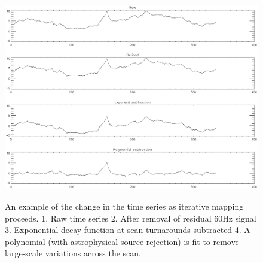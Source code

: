 \documentclass[12pt,preprint]{aastex}
\begin{document}
\begin{figure}
  \begin{minipage}{6.5in}
    \begin{center}
      \includegraphics[scale=0.9]{iterative_mapping1}
      \caption{An example of the change in the time series as
      iterative mapping proceeds.  1. Raw time series 2. After removal
      of residual 60Hz signal 3. Exponential decay function at scan
      turnarounds subtracted 4. A polynomial (with astrophysical source
      rejection) is fit to remove large-scale variations across the scan. }
    \end{center}
    \label{fig:IterativeMapping}
  \end{minipage}
\end{figure}

\addtocounter{figure}{0}
\addtocounter{subfig}{1}
\end{document}
